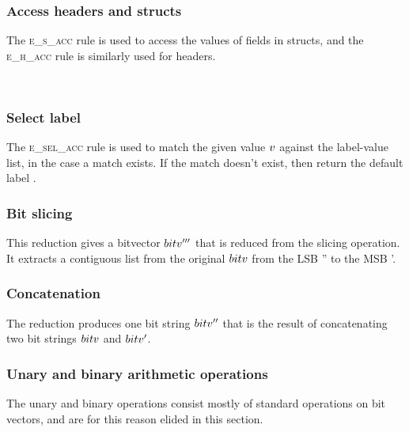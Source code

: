 \documentclass[UTF8]{article}
\begin{document}
\subsubsection*{Access headers and structs}
The \textsc{e\_s\_acc} rule is used to access the values of fields in structs, and the \textsc{e\_h\_acc} rule is similarly used for headers.

\begin{figure}[ht!]
    \ottusedrule{\ottdruleeXXsXXacc{}} \\
    \ottusedrule{\ottdruleeXXhXXacc{}} 
\end{figure}


\subsubsection*{Select label}
The \textsc{e\_sel\_acc} rule is used to match the given value $v$ against the label-value list, in the case a match exists. If the match doesn't exist, then return the default label \vn.

\begin{figure}[ht!]
    \ottusedrule{\ottdruleeXXselXXacc{}}
\end{figure}


\subsubsection*{Bit slicing}
This reduction gives a bitvector $bitv'''$ that is reduced from the slicing operation. It extracts a contiguous list from the original $bitv$ from the LSB \bitv'' to the MSB \bitv'.

\begin{figure}[ht!]
    \ottusedrule{\ottdruleeXXsliceXXv{}}
\end{figure}


\subsubsection*{Concatenation}
The reduction produces one bit string $bitv''$ that is the result of concatenating two bit strings $bitv$ and $bitv'$.

\begin{figure}[ht!]
    \ottusedrule{\ottdruleeXXconcatXXv{}}
\end{figure}


\subsubsection*{Unary and binary arithmetic operations}
The unary and binary operations consist mostly of standard operations on bit vectors, and are for this reason elided in this section.
\end{document}

